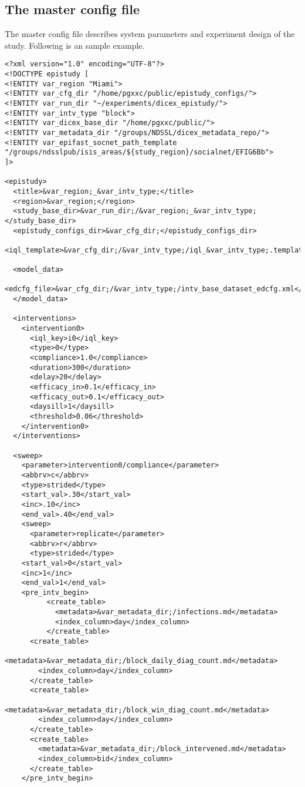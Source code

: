 \documentclass[11]{report}
\begin{document}
\subsection{The master config file}
The master config file describes system parameters and experiment design of the study.
Following is an sample example.
\begin{lstlisting}[style=XML]
  <?xml version="1.0" encoding="UTF-8"?>
<!DOCTYPE epistudy [
<!ENTITY var_region "Miami">
<!ENTITY var_cfg_dir "/home/pgxxc/public/epistudy_configs/">
<!ENTITY var_run_dir "~/experiments/dicex_epistudy/">
<!ENTITY var_intv_type "block">
<!ENTITY var_dicex_base_dir "/home/pgxxc/public/">
<!ENTITY var_metadata_dir "/groups/NDSSL/dicex_metadata_repo/">
<!ENTITY var_epifast_socnet_path_template "/groups/ndsslpub/isis_areas/${study_region}/socialnet/EFIG6Bb">
]>

<epistudy>
  <title>&var_region;_&var_intv_type;</title>
  <region>&var_region;</region>
  <study_base_dir>&var_run_dir;/&var_region;_&var_intv_type;</study_base_dir>
  <epistudy_configs_dir>&var_cfg_dir;</epistudy_configs_dir>
  <iql_template>&var_cfg_dir;/&var_intv_type;/iql_&var_intv_type;.template</iql_template>

  <model_data>
    <edcfg_file>&var_cfg_dir;/&var_intv_type;/intv_base_dataset_edcfg.xml</edcfg_file>
  </model_data>

  <interventions>
    <intervention0>
      <iql_key>i0</iql_key>
      <type>0</type>
      <compliance>1.0</compliance>
      <duration>300</duration>
      <delay>20</delay>
      <efficacy_in>0.1</efficacy_in>
      <efficacy_out>0.1</efficacy_out>
      <daysill>1</daysill>
      <threshold>0.06</threshold>
    </intervention0>
  </interventions>

  <sweep> 
    <parameter>intervention0/compliance</parameter>
    <abbrv>c</abbrv>
    <type>strided</type>
    <start_val>.30</start_val>
    <inc>.10</inc>
    <end_val>.40</end_val>
    <sweep>
      <parameter>replicate</parameter>
      <abbrv>r</abbrv>
      <type>strided</type>
	<start_val>0</start_val>
	<inc>1</inc>
	<end_val>1</end_val>
	<pre_intv_begin>
          <create_table>
            <metadata>&var_metadata_dir;/infections.md</metadata>
            <index_column>day</index_column>
          </create_table>
	  <create_table>
	    <metadata>&var_metadata_dir;/block_daily_diag_count.md</metadata>
	    <index_column>day</index_column>
	  </create_table>
	  <create_table>
	    <metadata>&var_metadata_dir;/block_win_diag_count.md</metadata>
	    <index_column>day</index_column>
	  </create_table>
	  <create_table>
	    <metadata>&var_metadata_dir;/block_intervened.md</metadata>
	    <index_column>bid</index_column>
	  </create_table>
	</pre_intv_begin>


\end{lstlisting}
\end{document}
